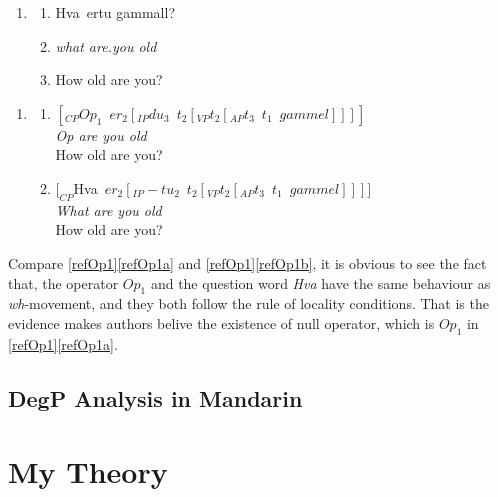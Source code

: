 \documentclass{ctexart}
\begin{document}
\begin{enumerate}[resume]
\item \label{refHva}
\begin{enumerate}
\item Hva\dh$\enspace$ertu gammall? 
\item \textit{what are.you old}
\item How old are you?
\end{enumerate}
\end{enumerate}

\begin{enumerate}[resume]
\item \label{refOp1}
\begin{enumerate}
\item \label{refOp1a} $[_{CP}Op_1 \enspace er_2[_{IP} du_3 \enspace t_2 [_{VP} t_2[_{AP} t_3 \enspace t_1 \enspace gammel]]]]$ \\
\textit{Op are you old} \\
How old are you?
\item \label{refOp1b} $[_{CP}$Hva\dh$\enspace er_2[_{IP} -tu_2 \enspace t_2 [_{VP} t_2[_{AP} t_3 \enspace t_1 \enspace gammel]]]]$ \\
\textit{What are you old} \\
How old are you?
\end{enumerate}
\end{enumerate}

Compare \ref{refOp1}\ref{refOp1a} and \ref{refOp1}\ref{refOp1b}, it is obvious to see the fact that, the operator $Op_1$ and the question word \textit{Hva\dh} \enspace have the same behaviour as \textit{wh}-movement, and they both follow the rule of locality conditions. That is the evidence makes authors belive the existence of null operator, which is $Op_1$ in \ref{refOp1}\ref{refOp1a}.


\subsection{DegP Analysis in Mandarin}



\section{My Theory}

\newpage

\printbibliography
\end{document}
